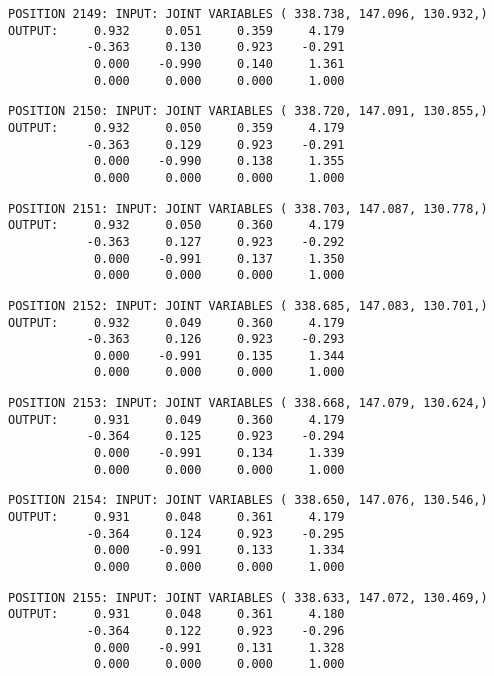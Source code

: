 \begin{verbatim}
POSITION 2149: INPUT: JOINT VARIABLES ( 338.738, 147.096, 130.932,)
OUTPUT:     0.932     0.051     0.359     4.179
           -0.363     0.130     0.923    -0.291
            0.000    -0.990     0.140     1.361
            0.000     0.000     0.000     1.000
\end{verbatim} \pagebreak[1]\begin{verbatim}
POSITION 2150: INPUT: JOINT VARIABLES ( 338.720, 147.091, 130.855,)
OUTPUT:     0.932     0.050     0.359     4.179
           -0.363     0.129     0.923    -0.291
            0.000    -0.990     0.138     1.355
            0.000     0.000     0.000     1.000
\end{verbatim} \pagebreak[1]\begin{verbatim}
POSITION 2151: INPUT: JOINT VARIABLES ( 338.703, 147.087, 130.778,)
OUTPUT:     0.932     0.050     0.360     4.179
           -0.363     0.127     0.923    -0.292
            0.000    -0.991     0.137     1.350
            0.000     0.000     0.000     1.000
\end{verbatim} \pagebreak[1]\begin{verbatim}
POSITION 2152: INPUT: JOINT VARIABLES ( 338.685, 147.083, 130.701,)
OUTPUT:     0.932     0.049     0.360     4.179
           -0.363     0.126     0.923    -0.293
            0.000    -0.991     0.135     1.344
            0.000     0.000     0.000     1.000
\end{verbatim} \pagebreak[1]\begin{verbatim}
POSITION 2153: INPUT: JOINT VARIABLES ( 338.668, 147.079, 130.624,)
OUTPUT:     0.931     0.049     0.360     4.179
           -0.364     0.125     0.923    -0.294
            0.000    -0.991     0.134     1.339
            0.000     0.000     0.000     1.000
\end{verbatim} \pagebreak[1]\begin{verbatim}
POSITION 2154: INPUT: JOINT VARIABLES ( 338.650, 147.076, 130.546,)
OUTPUT:     0.931     0.048     0.361     4.179
           -0.364     0.124     0.923    -0.295
            0.000    -0.991     0.133     1.334
            0.000     0.000     0.000     1.000
\end{verbatim} \pagebreak[1]\begin{verbatim}
POSITION 2155: INPUT: JOINT VARIABLES ( 338.633, 147.072, 130.469,)
OUTPUT:     0.931     0.048     0.361     4.180
           -0.364     0.122     0.923    -0.296
            0.000    -0.991     0.131     1.328
            0.000     0.000     0.000     1.000
\end{verbatim} \pagebreak[1]\begin{verbatim}

\end{verbatim}
